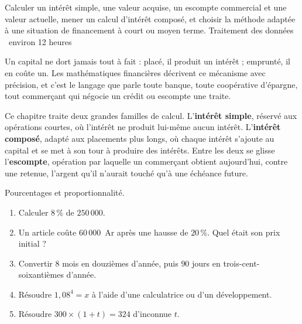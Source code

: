   {Calculer un intérêt simple, une valeur acquise, un escompte commercial et
   une valeur actuelle, mener un calcul d'intérêt composé, et choisir la
   méthode adaptée à une situation de financement à court ou moyen terme.}
  {Traitement des données \textbullet\ environ 12 heures}

Un capital ne dort jamais tout à fait : placé, il produit un intérêt ;
emprunté, il en coûte un. Les mathématiques financières décrivent ce
mécanisme avec précision, et c'est le langage que parle toute banque, toute
coopérative d'épargne, tout commerçant qui négocie un crédit ou escompte une
traite.

Ce chapitre traite deux grandes familles de calcul. L'\textbf{intérêt
simple}, réservé aux opérations courtes, où l'intérêt ne produit lui-même
aucun intérêt. L'\textbf{intérêt composé}, adapté aux placements plus longs,
où chaque intérêt s'ajoute au capital et se met à son tour à produire des
intérêts. Entre les deux se glisse l'\textbf{escompte}, opération par
laquelle un commerçant obtient aujourd'hui, contre une retenue, l'argent
qu'il n'aurait touché qu'à une échéance future.

\begin{revision}
Pourcentages et proportionnalité.

\begin{enumerate}[label=\textbf{\arabic*.}, leftmargin=*, itemsep=0.35em]
  \item Calculer $8\,\%$ de $250\,000$.
  \item Un article coûte $60\,000$~Ar après une hausse de $20\,\%$. Quel
        était son prix initial ?
  \item Convertir $8$ mois en douzièmes d'année, puis $90$ jours en
        trois-cent-soixantièmes d'année.
  \item Résoudre $1{,}08^{4} = x$ à l'aide d'une calculatrice ou d'un
        développement.
  \item Résoudre $300 \times (1+t) = 324$ d'inconnue $t$.
\end{enumerate}
\end{revision}

